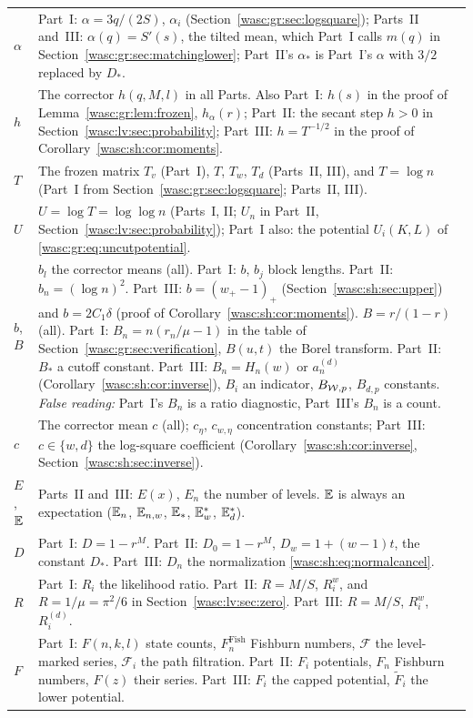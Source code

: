 \documentclass[11pt,a4paper]{article}
\theoremstyle{remark}\newtheorem{remark}[theorem]{Remark}
\numberwithin{equation}{section}
\begin{document}
\begin{longtable}{@{}>{\raggedright\arraybackslash}p{} >{\raggedright\arraybackslash}p{}@{}}
$\alpha$ & Part~I: $\alpha=3q/(2S)$, $\alpha_i$ (Section~\ref{wasc:gr:sec:logsquare}); Parts~II and~III: $\alpha(q)=S'(s)$, the tilted mean, which Part~I calls $m(q)$ in Section~\ref{wasc:gr:sec:matchinglower}; Part~II's $\alpha_*$ is Part~I's $\alpha$ with $3/2$ replaced by $D_*$.\\
$h$ & The corrector $h(q,M,l)$ in all Parts. Also Part~I: $h(s)$ in the proof of Lemma~\ref{wasc:gr:lem:frozen}, $h_\alpha(r)$; Part~II: the secant step $h>0$ in Section~\ref{wasc:lv:sec:probability}; Part~III: $h=T^{-1/2}$ in the proof of Corollary~\ref{wasc:sh:cor:moments}.\\
$T$ & The frozen matrix $T_v$ (Part~I), $T$, $T_w$, $T_d$ (Parts~II, III), and $T=\log n$ (Part~I from Section~\ref{wasc:gr:sec:logsquare}; Parts~II, III).\\
$U$ & $U=\log T=\log\log n$ (Parts~I, II; $U_n$ in Part~II, Section~\ref{wasc:lv:sec:probability}); Part~I also: the potential $U_i(K,L)$ of \eqref{wasc:gr:eq:uncutpotential}.\\
$b$, $B$ & $b_l$ the corrector means (all). Part~I: $b$, $b_j$ block lengths. Part~II: $b_n=(\log n)^2$. Part~III: $b=(w_+-1)_+$ (Section~\ref{wasc:sh:sec:upper}) and $b=2C_1\delta$ (proof of Corollary~\ref{wasc:sh:cor:moments}). $B=r/(1-r)$ (all). Part~I: $B_n=n(r_n/\mu-1)$ in the table of Section~\ref{wasc:gr:sec:verification}, $B(u,t)$ the Borel transform. Part~II: $B_*$ a cutoff constant. Part~III: $B_n=H_n(w)$ or $a^{(d)}_n$ (Corollary~\ref{wasc:sh:cor:inverse}), $B_i$ an indicator, $B_{\mathcal W,p}$, $B_{d,p}$ constants. \emph{False reading:} Part~I's $B_n$ is a ratio diagnostic, Part~III's $B_n$ is a count.\\
$c$ & The corrector mean $c$ (all); $c_\eta$, $c_{w,\eta}$ concentration constants; Part~III: $c\in\{w,d\}$ the log-square coefficient (Corollary~\ref{wasc:sh:cor:inverse}, Section~\ref{wasc:sh:sec:inverse}).\\
$E$, $\mathbb E$ & Parts~II and~III: $E(x)$, $E_n$ the number of levels. $\mathbb E$ is always an expectation ($\mathbb E_n$, $\mathbb E_{n,w}$, $\mathbb E_*$, $\mathbb E_w^*$, $\mathbb E_d^*$).\\
$D$ & Part~I: $D=1-r^M$. Part~II: $D_0=1-r^M$, $D_w=1+(w-1)t$, the constant $D_*$. Part~III: $D_n$ the normalization \eqref{wasc:sh:eq:normalcancel}.\\
$R$ & Part~I: $R_i$ the likelihood ratio. Part~II: $R=M/S$, $R_i^w$, and $R=1/\mu=\pi^2/6$ in Section~\ref{wasc:lv:sec:zero}. Part~III: $R=M/S$, $R_i^w$, $R_i^{(d)}$.\\
$F$ & Part~I: $F(n,k,l)$ state counts, $F^{\mathrm{Fish}}_n$ Fishburn numbers, $\mathcal F$ the level-marked series, $\mathcal F_i$ the path filtration. Part~II: $F_i$ potentials, $F_n$ Fishburn numbers, $F(z)$ their series. Part~III: $F_i$ the capped potential, $\widetilde F_i$ the lower potential.\\

\end{longtable}
\end{document}
